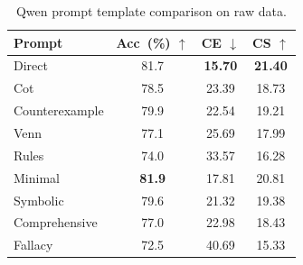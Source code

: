 \begin{table}[t]
  \centering
  \caption{Qwen prompt template comparison on raw data.}
  \label{tab:qwen_prompts}
  \begin{tabular}{lccc}
    \toprule
    Prompt & Acc~(\%) $\uparrow$ & CE $\downarrow$ & CS $\uparrow$ \\
    \midrule
    Direct & 81.7 & \textbf{15.70} & \textbf{21.40} \\
    Cot & 78.5 & 23.39 & 18.73 \\
    Counterexample & 79.9 & 22.54 & 19.21 \\
    Venn & 77.1 & 25.69 & 17.99 \\
    Rules & 74.0 & 33.57 & 16.28 \\
    Minimal & \textbf{81.9} & 17.81 & 20.81 \\
    Symbolic & 79.6 & 21.32 & 19.38 \\
    Comprehensive & 77.0 & 22.98 & 18.43 \\
    Fallacy & 72.5 & 40.69 & 15.33 \\
    \bottomrule
  \end{tabular}
\end{table}

